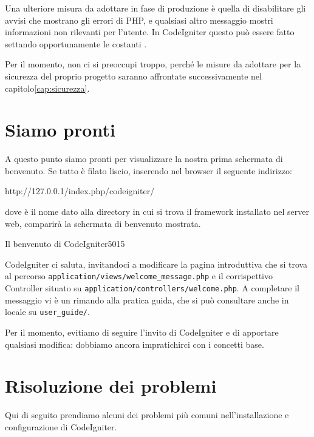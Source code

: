 Una ulteriore misura da adottare in fase di produzione è quella di disabilitare gli avvisi che mostrano gli errori di \ac{PHP}, e qualsiasi altro messaggio mostri informazioni non rilevanti per l'utente. In CodeIgniter questo può essere fatto settando opportunamente le costanti . 

Per il momento, non ci si preoccupi troppo, perché le misure da adottare per la sicurezza del proprio progetto saranno affrontate successivamente nel capitolo\vref{cap:sicurezza}.

\section{Siamo pronti}
A questo punto siamo pronti per visualizzare la nostra prima schermata di benvenuto. Se tutto è filato liscio, inserendo nel browser il seguente indirizzo:

\begin{code}
http://127.0.0.1/index.php/codeigniter/
\end{code}

dove  è il nome dato alla directory in cui si trova il framework installato nel server web, comparirà la schermata di benvenuto mostrata.

\begin{img}{Il benvenuto di CodeIgniter}{5}{015}
\end{img}

\label{sec:welcome}
CodeIgniter ci saluta, invitandoci a modificare la pagina introduttiva  che si trova al percorso \verb|application/views/welcome_message.php| e il corrispettivo Controller situato su \verb|application/controllers/welcome.php|. A completare il messaggio vi è un rimando alla pratica guida, che si può consultare anche in locale su \verb|user_guide/|. 

Per il momento, evitiamo di seguire l'invito di CodeIgniter e di apportare qualsiasi modifica: dobbiamo ancora impratichirci con i concetti base.

\label{sec:problemi}
\section{Risoluzione dei problemi}
Qui di seguito prendiamo alcuni dei problemi più comuni nell'installazione e configurazione di CodeIgniter.

